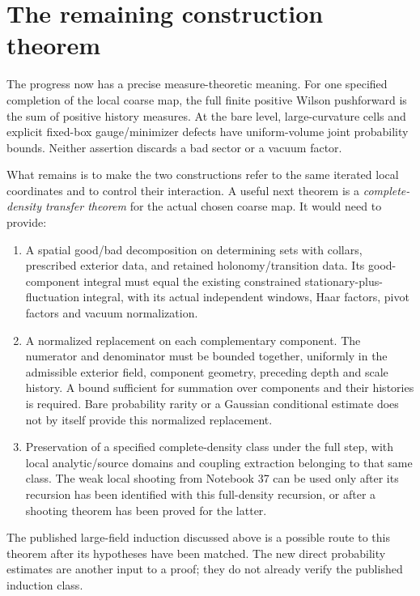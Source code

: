 \section{The remaining construction theorem}
\label{fmb:remaining}

The progress now has a precise measure-theoretic meaning. For one
specified completion of the local coarse map, the full finite
positive Wilson pushforward is the sum of positive history measures.
At the bare level, large-curvature cells and explicit fixed-box
gauge/minimizer defects have uniform-volume joint probability
bounds. Neither assertion discards a bad sector or a vacuum factor.

What remains is to make the two constructions refer to the same
iterated local coordinates and to control their interaction. A
useful next theorem is a \emph{complete-density transfer theorem}
for the actual chosen coarse map. It would need to provide:
\begin{enumerate}
\item A spatial good/bad decomposition on determining sets with
collars, prescribed exterior data, and retained holonomy/transition
data. Its good-component integral must equal the existing
constrained stationary-plus-fluctuation integral, with its actual
independent windows, Haar factors, pivot factors and vacuum
normalization.
\item A normalized replacement on each complementary component.
The numerator and denominator must be bounded together, uniformly
in the admissible exterior field, component geometry, preceding
depth and scale history. A bound sufficient for summation over
components and their histories is required. Bare probability
rarity or a Gaussian conditional estimate does not by itself
provide this normalized replacement.
\item Preservation of a specified complete-density class under the
full step, with local analytic/source domains and coupling
extraction belonging to that same class. The weak local shooting
from Notebook 37 can be used only after its recursion has been
identified with this full-density recursion, or after a shooting
theorem has been proved for the latter.
\end{enumerate}
The published large-field induction discussed above is a possible
route to this theorem after its hypotheses have been matched.
The new direct probability estimates are another input to a proof;
they do not already verify the published induction class.

